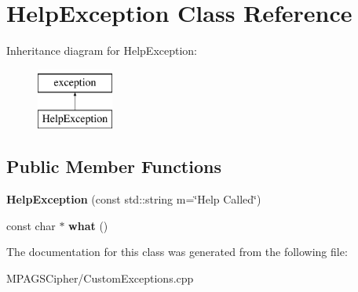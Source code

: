 \hypertarget{class_help_exception}{\section{Help\-Exception Class Reference}
\label{class_help_exception}
}
Inheritance diagram for Help\-Exception\-:\begin{figure}[H]
\begin{center}
\leavevmode
\includegraphics[height=2.000000cm]{class_help_exception}
\end{center}
\end{figure}
\subsection*{Public Member Functions}
\begin{DoxyCompactItemize}
\item 
\hypertarget{class_help_exception_af180aed08aeca8db0798de2ba23b3a18}{{\bfseries Help\-Exception} (const std\-::string m=\char`\"{}Help Called\char`\"{})}\label{class_help_exception_af180aed08aeca8db0798de2ba23b3a18}

\item 
\hypertarget{class_help_exception_aa486f90b62ddc54b614e54e69d7eec59}{const char $\ast$ {\bfseries what} ()}\label{class_help_exception_aa486f90b62ddc54b614e54e69d7eec59}

\end{DoxyCompactItemize}


The documentation for this class was generated from the following file\-:\begin{DoxyCompactItemize}
\item 
M\-P\-A\-G\-S\-Cipher/Custom\-Exceptions.\-cpp\end{DoxyCompactItemize}
